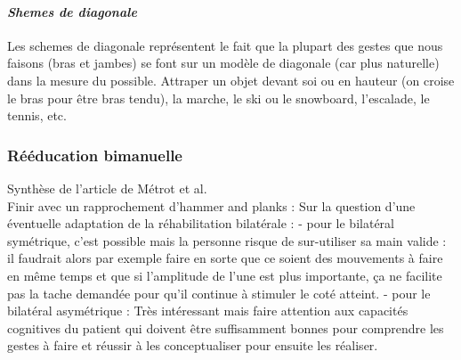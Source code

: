 		\paragraph{\emph{Shemes de diagonale}\\}
Les schemes de diagonale représentent le fait que la plupart des gestes que nous faisons (bras et jambes) se font sur un modèle de diagonale (car plus naturelle) dans la mesure du possible. Attraper un objet devant soi ou en hauteur (on croise le bras pour être bras tendu), la marche, le ski ou le snowboard, l'escalade, le tennis, etc.	
	
	
	\subsubsection{Rééducation bimanuelle} \label{bilateral}
Synthèse de l'article de Métrot et al. \\
Finir avec un rapprochement d'hammer and planks : Sur la question d’une éventuelle adaptation de la réhabilitation bilatérale :
- pour le bilatéral symétrique, c’est possible mais la personne risque de sur-utiliser sa main valide : il faudrait alors par exemple faire en sorte que ce soient des mouvements à faire en même temps et que si l’amplitude de l’une est plus importante, ça ne facilite pas la tache demandée pour qu’il continue à stimuler le coté atteint.
- pour le bilatéral asymétrique : Très intéressant mais faire attention aux capacités cognitives du patient qui doivent être suffisamment bonnes pour comprendre les gestes à faire et réussir à les conceptualiser pour ensuite les réaliser.